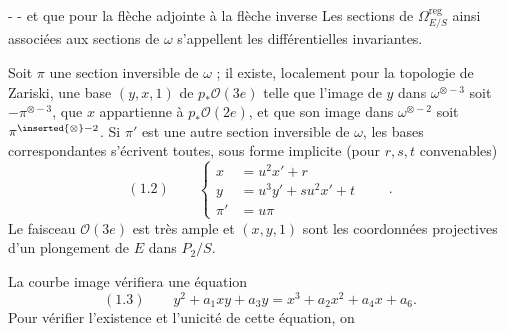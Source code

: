 -  -
et que pour la flèche adjointe à la flèche inverse
Les sections de $\Omega^{\mathrm{reg}}_{E/S}$ ainsi associées aux sections de $\omega$ s'appellent les différentielles invariantes.

Soit $\pi$ une section inversible de $\omega$ ; il existe, localement pour la topologie de Zariski, une base $(y,x,1)$ de $p_*\mathcal O(3e)$ telle que l'image de $y$ dans $\omega^{\otimes-3}$ soit $-\pi^{\otimes-3}$, que $x$ appartienne à $p_*\mathcal O(2e)$, et que son image dans $\omega^{\otimes-2}$ soit $\pi^{\inserted{\otimes}-2}$. Si $\pi'$ est une autre section inversible de $\omega$, les bases correspondantes s'écrivent toutes, sous forme implicite (pour $r,s,t$ convenables)
\[
(1.2)\qquad\left\{\begin{aligned}
x&=u^2x'+r\\
y&=u^3y'+su^2x'+t\\
\pi'&=u\pi
\end{aligned}\right.\qquad .
\]
Le faisceau $\mathcal O(3e)$ est très ample et $(x,y,1)$ sont les coordonnées projectives d'un plongement de $E$ dans $P_2/S$.

La courbe image vérifiera une équation
\[
(1.3)\qquad y^2+a_1xy+a_3y=x^3+a_2x^2+a_4x+a_6.
\]
Pour vérifier l'existence et l'unicité de cette équation, on
